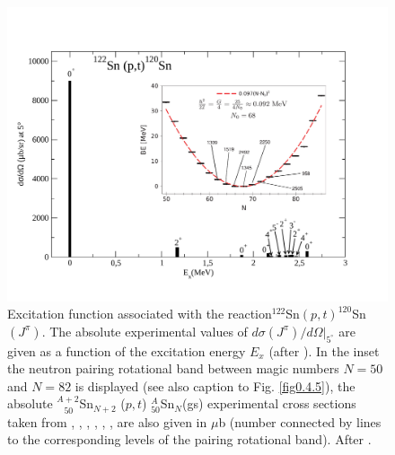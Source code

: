   \begin{figure}
  \centerline{\includegraphics*[width=\textwidth,angle=0]{nutshell/figs/ExcitedSn122pt.pdf}}
  \caption[$^{122}$Sn$(p,t)^{120}$Sn$(J^\pi)$.]{ Excitation function associated with the reaction$^{122}$Sn$(p,t)^{120}$Sn$(J^\pi)$. The absolute experimental values of $d\sigma(J^\pi)/d\Omega|_{5^\circ}$ are given as a function of the excitation energy $E_x$ (after \cite{Guazzoni:11}). In the inset the  neutron pairing rotational band between magic numbers $N=50$ and $N=82$ is  displayed (see also caption to Fig. \ref{fig0.4.5}), the absolute $^{A+2}_{\;\;\;50}$Sn$_{N+2}$ ($p,t$) $^{A}_{50}$Sn$_{N}$(gs) experimental cross sections taken from \cite{Guazzoni:99}, \cite{Guazzoni:04}, \cite{Guazzoni:06}, \cite{Guazzoni:08}, \cite{Guazzoni:11}, \cite{Guazzoni:12}, are also given in $\mu$b (number connected by lines to the corresponding levels of the pairing rotational band). After \cite{Potel:13}.}\label{fig1.3}
  \end{figure}
